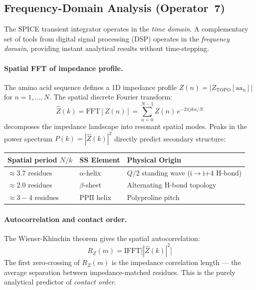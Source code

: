 \subsection{Frequency-Domain Analysis (Operator~7)}
\label{sec:freq_domain}

The SPICE transient integrator operates in the \emph{time domain}.
A complementary set of tools from digital signal processing (DSP)
operates in the \emph{frequency domain}, providing instant analytical
results without time-stepping.

\paragraph{Spatial FFT of impedance profile.}
The amino acid sequence defines a 1D impedance profile
$Z(n) = |Z_\text{TOPO}[\text{aa}_n]|$ for $n = 1,\ldots,N$.
The spatial discrete Fourier transform:
\begin{equation}
    \hat{Z}(k) = \text{FFT}[Z(n)]
    = \sum_{n=0}^{N-1} Z(n)\, e^{-2\pi j k n / N}
    \label{eq:z_fft}
\end{equation}
decomposes the impedance landscape into resonant spatial modes.
Peaks in the power spectrum $P(k) = |\hat{Z}(k)|^2$ directly
predict secondary structure:
\begin{center}
\small
\begin{tabular}{@{}l l l@{}}
\toprule
\textbf{Spatial period} $N/k$ & \textbf{SS Element} & \textbf{Physical Origin} \\
\midrule
$\approx 3.7$ residues & $\alpha$-helix & $Q/2$ standing wave (i$\to$i+4 H-bond) \\
$\approx 2.0$ residues & $\beta$-sheet & Alternating H-bond topology \\
$\approx 3{-}4$ residues & PPII helix & Polyproline pitch \\
\bottomrule
\end{tabular}
\end{center}

\paragraph{Autocorrelation and contact order.}
The Wiener-Khinchin theorem gives the spatial autocorrelation:
\begin{equation}
    R_Z(m) = \text{IFFT}\bigl[|\hat{Z}(k)|^2\bigr]
    \label{eq:autocorr}
\end{equation}
The first zero-crossing of $R_Z(m)$ is the impedance correlation
length --- the average separation between impedance-matched residues.
This is the purely analytical predictor of \emph{contact order}.

